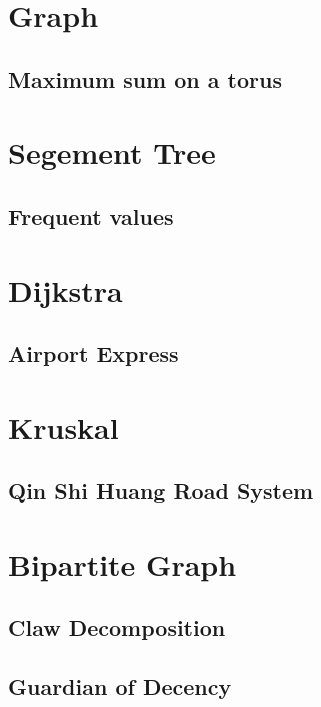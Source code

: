 \section{Graph}
        \subsection{Maximum sum on a torus}
                

\section{Segement Tree}
        \subsection{Frequent values}
                

\section{Dijkstra}
        \subsection{Airport Express}
                

\section{Kruskal}
        \subsection{Qin Shi Huang Road System}
                

\section{Bipartite Graph}
        \subsection{Claw Decomposition}
                
        \subsection{Guardian of Decency}
                
